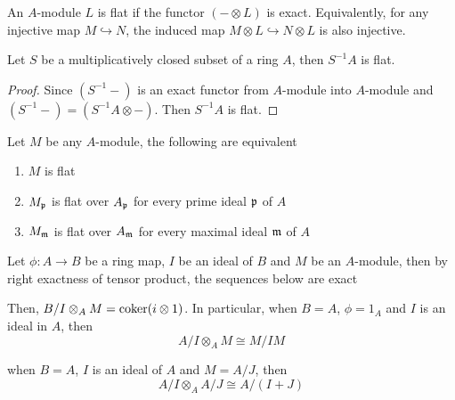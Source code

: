 \begin{definition}
	An $A$-module $L$ is flat if the functor $(- \otimes L)$ is exact. Equivalently, for any injective map $M \hookrightarrow N$, the induced map $M \otimes L \hookrightarrow N \otimes L$ is also injective.
\end{definition}

\begin{proposition}
	Let $S$ be a multiplicatively closed subset of a ring $A$, then $S^{-1} A$ is flat.
\end{proposition}

\begin{proof}
	Since $(S^{-1} -)$ is an exact functor from $A$-module into $A$-module and $(S^{-1} -) = (S^{-1} A \otimes -)$. Then $S^{-1} A$ is flat.
\end{proof}

\begin{proposition}
	Let $M$ be any $A$-module, the following are equivalent
	\begin{enumerate}
		\item $M$ is flat
		\item $M_{\mathfrak{p}}$ is flat over $A_{\mathfrak{p}}$ for every prime ideal $\mathfrak{p}$ of $A$
		\item $M_{\mathfrak{m}}$ is flat over $A_{\mathfrak{m}}$ for every maximal ideal $\mathfrak{m}$ of $A$
	\end{enumerate}
\end{proposition}

\begin{lemma}
	Let $\phi: A \to B$ be a ring map, $I$ be an ideal of $B$ and $M$ be an $A$-module, then by right exactness of tensor product, the sequences below are exact
	\begin{center}
	\end{center}
	
	Then, $B/I \otimes_A M = \operatorname{coker} (i \otimes 1)$. In particular, when $B = A$, $\phi = 1_A$ and $I$ is an ideal in $A$, then
	$$
		A / I \otimes_A M \cong M / IM
	$$
	
	when $B = A$, $I$ is an ideal of $A$ and $M = A/J$, then
	$$
		A / I \otimes_A A/J \cong A / (I + J)
	$$
\end{lemma}


